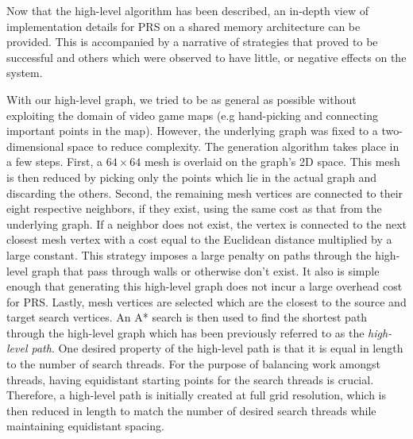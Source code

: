 Now that the high-level algorithm has been described, an in-depth view of implementation details for PRS on a shared memory architecture can be provided. This is accompanied by a narrative of strategies that proved to be successful and others which were observed to have little, or negative effects on the system.

With our high-level graph, we tried to be as general as possible without exploiting the domain of video game maps (e.g hand-picking and connecting important points in the map). However, the underlying graph was fixed to a two-dimensional space to reduce complexity. The generation algorithm takes place in a few steps. 
First, a $64 \times 64$ mesh is overlaid on the graph's 2D space. 
This mesh is then reduced by picking only the points which lie in the actual graph and discarding the others.
Second, the remaining mesh vertices are connected to their eight respective neighbors, if they exist, using the same cost as that from the underlying graph.
If a neighbor does not exist, the vertex is connected to the next closest mesh vertex with a cost equal to the Euclidean distance multiplied by a large constant.
This strategy imposes a large penalty on paths through the high-level graph that  pass through walls or otherwise don't exist. 
It also is simple enough that generating this high-level graph does not incur a large overhead cost for PRS.
Lastly, mesh vertices are selected which are the closest to the source and target search vertices. An A* search is then used to find the shortest path through the high-level graph which has been previously referred to as the \textit{high-level path}. 
One desired property of the high-level path is that it is equal in length to the number of search threads. 
For the purpose of balancing work amongst threads, having equidistant starting points for the search threads is crucial.
Therefore, a high-level path is initially created at full grid resolution, which is then reduced in length to match the number of desired search threads while maintaining equidistant spacing.

